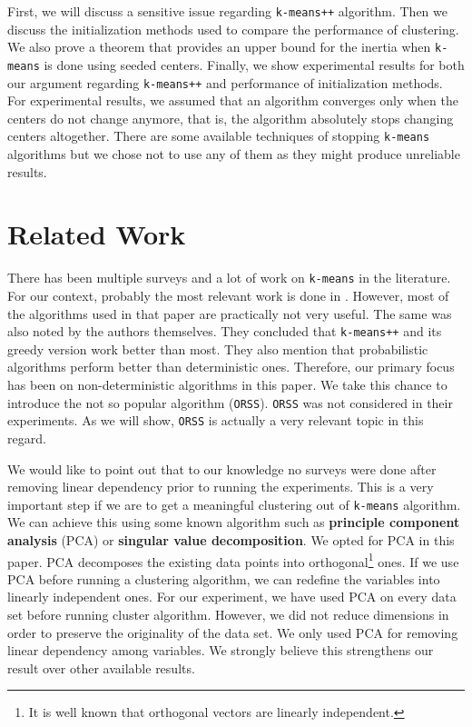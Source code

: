 \documentclass[twoside, 11pt]{article}
\begin{document}
	First, we will discuss a sensitive issue regarding \texttt{k-means++} algorithm. Then we discuss the initialization methods used to compare the performance of clustering. We also prove a theorem that provides an upper bound for the inertia when \texttt{k-means} is done using seeded centers. Finally, we show experimental results for both our argument regarding \texttt{k-means++} and performance of initialization methods. For experimental results, we assumed that an algorithm converges only when the centers do not change anymore, that is, the algorithm absolutely stops changing centers altogether. There are some available techniques of stopping \texttt{k-means} algorithms but we chose not to use any of them as they might produce unreliable results.
	\section{Related Work}
	There has been multiple surveys and a lot of work on \texttt{k-means} in the literature. For our context, probably the most relevant work is done in \citet{celebi}. However, most of the algorithms used in that paper are practically not very useful. The same was also noted by the authors themselves. They concluded that \texttt{k-means++} and its greedy version work better than most. They also mention that probabilistic algorithms perform better than deterministic ones. Therefore, our primary focus has been on non-deterministic algorithms in this paper. We take this chance to introduce the not so popular algorithm \citet{ostrovsky} (\texttt{ORSS}). \texttt{ORSS} was not considered in their experiments. As we will show, \texttt{ORSS} is actually a very relevant topic in this regard.
	
	We would like to point out that to our knowledge no surveys were done after removing linear dependency prior to running the experiments. This is a very important step if we are to get a meaningful clustering out of \texttt{k-means} algorithm. We can achieve this using some known algorithm such as \textbf{principle component analysis} (PCA) or \textbf{singular value decomposition}. We opted for PCA in this paper. PCA decomposes the existing data points into orthogonal\footnote{It is well known that orthogonal vectors are linearly independent.} ones. If we use PCA before running a clustering algorithm, we can redefine the variables into linearly independent ones. For our experiment, we have used PCA on every data set before running cluster algorithm. However, we did not reduce dimensions in order to preserve the originality of the data set. We only used PCA for removing linear dependency among variables. We strongly believe this strengthens our result over other available results.
\end{document}
